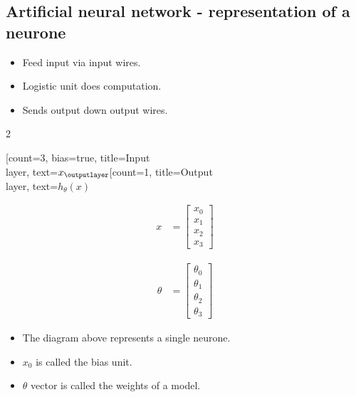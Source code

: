 \documentclass{article}
\begin{document}
\subsection*{Artificial neural network - representation of a neurone}

\begin{itemize}
  \item Feed input via input wires.
  \item Logistic unit does computation.
  \item Sends output down output wires.
\end{itemize}

\begin{multicols}{2}

  \begin{neuralnetwork}[height=4]
    \newcommand{\x}[2]{$x_#2$}
    \newcommand{\y}[2]{$h_{\theta}(x)$}
    [count=3, bias=true, title=Input\\layer, text=\x]
    \outputlayer[count=1, title=Output\\layer, text=\y] \linklayers
  \end{neuralnetwork}

  \columnbreak

  \begin{align*}
    x & = \begin{bmatrix}
      x_{0} \\
      x_{1} \\
      x_2   \\
      x_3
    \end{bmatrix}
  \end{align*}


  \begin{align*}
    \theta & = \begin{bmatrix}
      \theta_{0} \\
      \theta_{1} \\
      \theta_2   \\
      \theta_3
    \end{bmatrix}
  \end{align*}
\end{multicols}

\begin{itemize}
  \item The diagram above represents a single neurone.
  \item $x_0$ is called the bias unit.
  \item $\theta$ vector is called the weights of a model.
\end{itemize}
\end{document}
